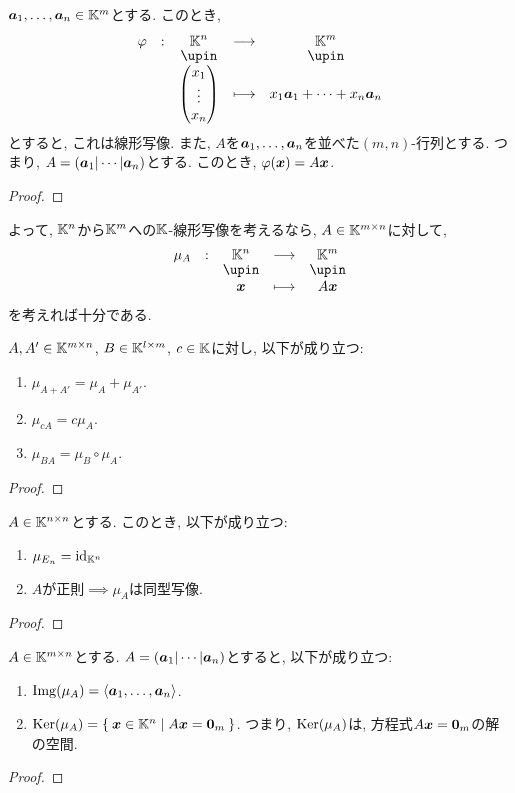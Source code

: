 \begin{lemma}
  $\boldsymbol{a}_1,\ldots,\boldsymbol{a}_n\in \mathbb{K}^m$とする.
  このとき,
  \begin{align*}
    \shazo{\varphi}{\KK^n}{\KK^m}
          {\begin{pmatrix}x_1\\\vdots\\x_n\end{pmatrix}}
          {x_1\aaa_1+\cdots+x_n\aaa_n}
  \end{align*}
  とすると, これは線形写像.
  また, $A$を$\boldsymbol{a}_1,\ldots,\boldsymbol{a}_n$を並べた$(m,n)$-行列とする.
  つまり, $A=(\boldsymbol{a}_1|\cdots|\boldsymbol{a}_n)$とする.
  このとき, $\varphi(\boldsymbol{x})=A\boldsymbol{x}$.
\end{lemma}
\begin{proof}\end{proof}

よって, 
$\mathbb{K}^n$から$\mathbb{K}^m$への$\mathbb{K}$-線形写像を考えるなら,
$A\in\mathbb{K}^{m\times n}$に対して,
\begin{align*}
  \shazo{\mu_A}{\KK^n}{\KK^m}
        {\xx}
        {A\xx}
\end{align*}
を考えれば十分である.

\begin{prop}
  $A,A'\in \mathbb{K}^{m\times n}$,
  $B\in\mathbb{K}^{l\times m}$,
  $c\in\mathbb{K}$に対し, 以下が成り立つ:
  \begin{enumerate}
  \item $\mu_{A+A'}=\mu_A+\mu_{A'}$.
  \item $\mu_{cA}=c\mu_A$.
  \item $\mu_{BA}=\mu_B\circ\mu_{A}$.
  \end{enumerate}
\end{prop}
\begin{proof}\end{proof}

\begin{cor}
  $A\in \mathbb{K}^{n\times n}$とする.
  このとき,
  以下が成り立つ:
  \begin{enumerate}
  \item $\mu_{E_n}=\operatorname{id}_{\mathbb{K}^n}$
  \item $A$が正則$\implies \mu_A$は同型写像.
  \end{enumerate}
\end{cor}
\begin{proof}\end{proof}


\begin{prop}
  $A\in\mathbb{K}^{m\times n}$とする.
  $A=(\boldsymbol{a}_1|\cdots|\boldsymbol{a}_n)$とすると,
  以下が成り立つ:
  \begin{enumerate}
  \item $\operatorname{Img}(\mu_A)=\Braket{\boldsymbol{a}_1,\ldots,\boldsymbol{a}_n}$.
  \item $\operatorname{Ker}(\mu_A)=\Set{\boldsymbol{x}\in\mathbb{K}^n|A\boldsymbol{x}=\boldsymbol{0}_m}$. つまり, $\operatorname{Ker}(\mu_A)$は,
    方程式$A\boldsymbol{x}=\boldsymbol{0}_m$の解の空間.
  \end{enumerate}
\end{prop}
\begin{proof}\end{proof}

